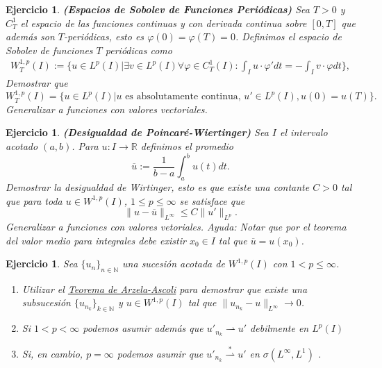 \documentclass{article}
\newcounter{ejer}
\newtheorem{ejercicio}[ejer]{Ejercicio}}
\newcommand{\rr}{\mathbb{R}}
\newcommand{\nn}{\mathbb{N}}
\begin{document}
\begin{ejercicio} \textbf{(Espacios de Sobolev de Funciones Periódicas)} Sea $T>0$ y $C_T^1$ el espacio de las funciones continuas y con derivada continua sobre $[0,T]$
que además son $T$-periódicas, esto es $\varphi(0)=\varphi(T)=0$. Definimos el espacio de Sobolev de funciones $T$ periódicas como
\[
\begin{split}
W^{1,p}_T(I):=\bigg\{ u\in L^p(I) \bigg| \exists v\in  L^p(I) \forall\varphi \in C_T^1(I)  : \int_I u\cdot \varphi' dt=-  \int_I v\cdot \varphi dt \bigg\},
\end{split}
\]
Demostrar que
 \[
W^{1,p}_T(I)=\bigg\{ u\in L^p(I) \bigg| u \text{ es absolutamente continua, }  u'\in L^p(I), u(0)=u(T)
 \bigg\}.
\]
Generalizar a funciones con valores vectoriales.

\end{ejercicio}

\begin{ejercicio}  \textbf{(Desigualdad de Poincaré-Wiertinger)} Sea $I$ el intervalo acotado $(a,b)$.  Para $u:I\to\rr$ definimos el promedio
\[\overline{u}:=\frac{1}{b-a}\int_a^bu(t)dt.\]
Demostrar la desigualdad de Wirtinger, esto es que existe una contante $C>0$ tal que para toda  $u\in W^{1,p}(I)$, $1\leq p\leq \infty$ se satisface que
\[\|u-\overline{u}\|_{L^{\infty}}\leq C\|u'\|_{L^p}.\]
Generalizar a funciones con valores vetoriales.
\emph{Ayuda: } Notar que  por el teorema del valor medio para integrales debe existir $x_0\in I$ tal que $\overline{u}=u(x_0)$.

\end{ejercicio}



\begin{ejercicio} Sea $\{u_n\}_{n\in\nn}$ una sucesión acotada de $W^{1,p}(I)$ con $1<p\leq \infty$.
 \begin{enumerate}
  \item Utilizar el \href{https://es.wikipedia.org/wiki/Teorema_de_Arzel\%C3\%A1-Ascoli}{Teorema de Arzela-Ascoli} para demostrar que existe una subsucesión $\{u_{n_k}\}_{k\in\nn}$ y $u\in W^{1,p}(I)$ tal que $\|  u_{n_k}-u\|_{L^{\infty}}\to 0$.
  \item Si $1<p<\infty$ podemos asumir además que $ u'_{n_k} \rightharpoonup u'$ debilmente en $L^p(I)$
  \item Si, en cambio,  $p=\infty$  podemos asumir que $ u'_{n_k} \overset{*}{\rightharpoonup} u'$ en $\sigma(L^{\infty},L^1)$ .
 \end{enumerate}
\end{ejercicio}
\end{document}
